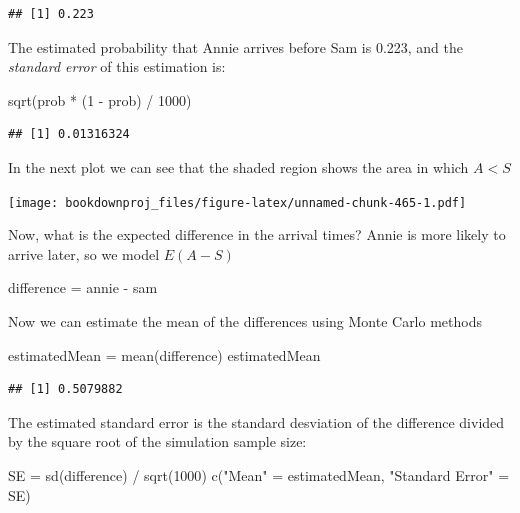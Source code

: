 \documentclass[
]{book}
\newenvironment{Shaded}{\begin{snugshade}}{\end{snugshade}}
\newcommand{\DecValTok}[1]{\textcolor[rgb]{0.00,0.00,0.81}{#1}}
\newcommand{\FunctionTok}[1]{\textcolor[rgb]{0.00,0.00,0.00}{#1}}
\newcommand{\NormalTok}[1]{#1}
\newcommand{\OtherTok}[1]{\textcolor[rgb]{0.56,0.35,0.01}{#1}}
\newcommand{\SpecialCharTok}[1]{\textcolor[rgb]{0.00,0.00,0.00}{#1}}
\newcommand{\StringTok}[1]{\textcolor[rgb]{0.31,0.60,0.02}{#1}}
\theoremstyle{definition}
\theoremstyle{definition}
\theoremstyle{definition}
\theoremstyle{definition}
\theoremstyle{remark}
\begin{document}
\begin{verbatim}
## [1] 0.223
\end{verbatim}

The estimated probability that Annie arrives before Sam is 0.223, and the \emph{standard error} of this estimation is:

\begin{Shaded}
\begin{Highlighting}[]
\FunctionTok{sqrt}\NormalTok{(prob }\SpecialCharTok{*}\NormalTok{ (}\DecValTok{1} \SpecialCharTok{{-}}\NormalTok{ prob) }\SpecialCharTok{/} \DecValTok{1000}\NormalTok{)}
\end{Highlighting}
\end{Shaded}

\begin{verbatim}
## [1] 0.01316324
\end{verbatim}

In the next plot we can see that the shaded region shows the area in which \(A < S\)

\texttt{[image: bookdownproj\_files/figure-latex/unnamed-chunk-465-1.pdf]}

Now, what is the expected difference in the arrival times? Annie is more likely to arrive later, so we model \(E(A-S)\)

\begin{Shaded}
\begin{Highlighting}[]
\NormalTok{difference }\OtherTok{=}\NormalTok{ annie }\SpecialCharTok{{-}}\NormalTok{ sam}
\end{Highlighting}
\end{Shaded}

Now we can estimate the mean of the differences using Monte Carlo methods

\begin{Shaded}
\begin{Highlighting}[]
\NormalTok{estimatedMean }\OtherTok{=} \FunctionTok{mean}\NormalTok{(difference)}
\NormalTok{estimatedMean}
\end{Highlighting}
\end{Shaded}

\begin{verbatim}
## [1] 0.5079882
\end{verbatim}

The estimated standard error is the standard desviation of the difference divided by the square root of the simulation sample size:

\begin{Shaded}
\begin{Highlighting}[]
\NormalTok{SE }\OtherTok{=} \FunctionTok{sd}\NormalTok{(difference) }\SpecialCharTok{/} \FunctionTok{sqrt}\NormalTok{(}\DecValTok{1000}\NormalTok{)}
\FunctionTok{c}\NormalTok{(}\StringTok{"Mean"} \OtherTok{=}\NormalTok{ estimatedMean, }\StringTok{"Standard Error"} \OtherTok{=}\NormalTok{ SE)}
\end{Highlighting}
\end{Shaded}
\end{document}
